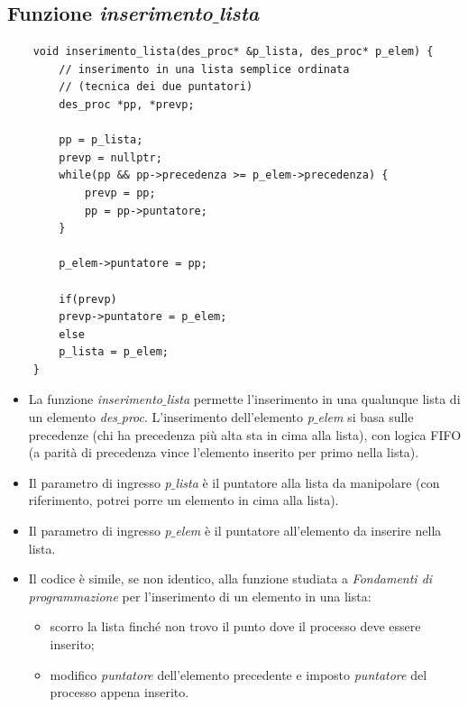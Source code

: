 \subsection{Funzione \emph{inserimento$\_$lista}}
\small
\begin{verbatim}
	void inserimento_lista(des_proc* &p_lista, des_proc* p_elem) {
		// inserimento in una lista semplice ordinata
		// (tecnica dei due puntatori)
		des_proc *pp, *prevp;
		
		pp = p_lista;
		prevp = nullptr;
		while(pp && pp->precedenza >= p_elem->precedenza) {
			prevp = pp;
			pp = pp->puntatore;
		}
		
		p_elem->puntatore = pp;
		
		if(prevp)
		prevp->puntatore = p_elem;
		else
		p_lista = p_elem;
	}
\end{verbatim}
\normalsize 
\begin{itemize}
	\item La funzione \emph{inserimento$\_$lista} permette l'inserimento in una qualunque lista di un elemento \emph{des$\_$proc}. L'inserimento dell'elemento \emph{p$\_$elem} si basa sulle precedenze (chi ha precedenza più alta sta in cima alla lista), con logica FIFO (a parità di precedenza vince l'elemento inserito per primo nella lista).
	\item Il parametro di ingresso \emph{p$\_$lista} è il puntatore alla lista da manipolare (con riferimento, potrei porre un elemento in cima alla lista). 
	\item Il parametro di ingresso \emph{p$\_$elem} è il puntatore all'elemento da inserire nella lista.
	\item Il codice è simile, se non identico, alla funzione studiata a \emph{Fondamenti di programmazione} per l'inserimento di un elemento in una lista: 
	\begin{itemize}
		\item scorro la lista finché non trovo il punto dove il processo deve essere inserito;
		\item modifico \emph{puntatore} dell'elemento precedente e imposto \emph{puntatore} del processo appena inserito.
	\end{itemize}
\end{itemize}

